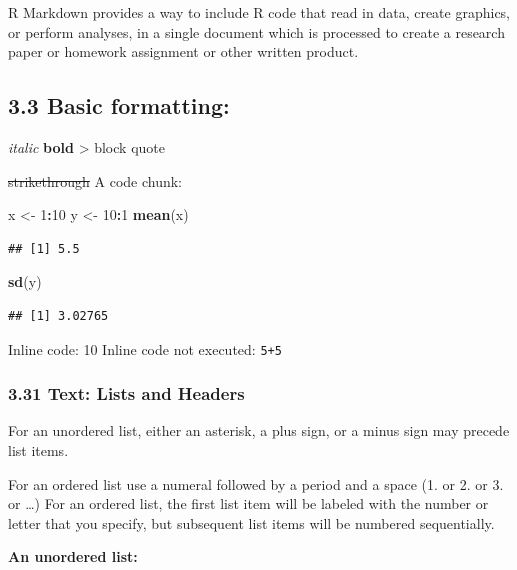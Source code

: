 \documentclass[]{article}
\newenvironment{Shaded}{\begin{snugshade}}{\end{snugshade}}
\newcommand{\KeywordTok}[1]{\textcolor[rgb]{0.13,0.29,0.53}{\textbf{#1}}}
\newcommand{\DecValTok}[1]{\textcolor[rgb]{0.00,0.00,0.81}{#1}}
\newcommand{\StringTok}[1]{\textcolor[rgb]{0.31,0.60,0.02}{#1}}
\newcommand{\OperatorTok}[1]{\textcolor[rgb]{0.81,0.36,0.00}{\textbf{#1}}}
\newcommand{\NormalTok}[1]{#1}
\begin{document}
R Markdown provides a way to include R code that read in data, create
graphics, or perform analyses, in a single document which is processed
to create a research paper or homework assignment or other written
product.

\subsection{3.3 Basic formatting:}\label{basic-formatting}

\emph{italic} \textbf{bold} \textgreater{} block quote

\sout{strikethrough} A code chunk:

\begin{Shaded}
\begin{Highlighting}[]
\NormalTok{x <-}\StringTok{ }\DecValTok{1}\OperatorTok{:}\DecValTok{10}
\NormalTok{y <-}\StringTok{ }\DecValTok{10}\OperatorTok{:}\DecValTok{1}
\KeywordTok{mean}\NormalTok{(x)}
\end{Highlighting}
\end{Shaded}

\begin{verbatim}
## [1] 5.5
\end{verbatim}

\begin{Shaded}
\begin{Highlighting}[]
\KeywordTok{sd}\NormalTok{(y)}
\end{Highlighting}
\end{Shaded}

\begin{verbatim}
## [1] 3.02765
\end{verbatim}

Inline code: 10 Inline code not executed: \texttt{5+5}

\subsubsection{3.31 Text: Lists and
Headers}\label{text-lists-and-headers}

For an unordered list, either an asterisk, a plus sign, or a minus sign
may precede list items.

For an ordered list use a numeral followed by a period and a space (1.
or 2. or 3. or \ldots{}) For an ordered list, the first list item will
be labeled with the number or letter that you specify, but subsequent
list items will be numbered sequentially.

\textbf{An unordered list:}
\end{document}
